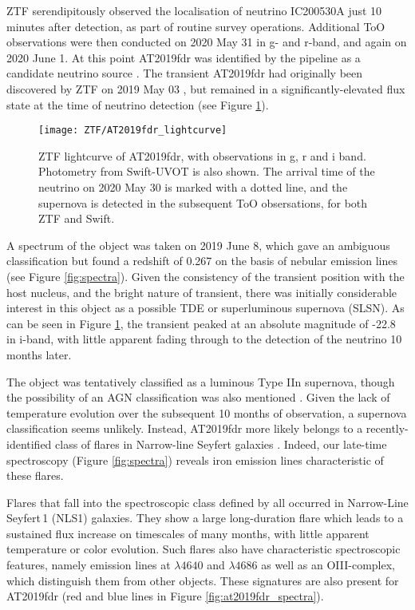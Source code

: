 ZTF serendipitously observed the localisation of neutrino IC200530A just 10 minutes after detection, as part of routine survey operations\cite{IC200530A}. Additional ToO observations were then conducted on 2020 May 31 in g- and r-band, and again on 2020 June 1. At this point AT2019fdr was identified by the pipeline as a candidate neutrino source  . The transient AT2019fdr had originally been discovered by ZTF on 2019 May 03 \cite{at2019fdr_ampel_disc}, but remained in a significantly-elevated flux state at the time of neutrino detection (see Figure \ref{fig:AT2019fdr_lightcurve}). 

\begin{figure}[!ht]
	\centering \texttt{[image: ZTF/AT2019fdr\_lightcurve]}
	\caption{ZTF lightcurve of AT2019fdr, with observations in g, r and i band. Photometry from Swift-UVOT is also shown. The arrival time of the neutrino on 2020 May 30 is marked with a dotted line, and the supernova is detected in the subsequent ToO obsersations, for both ZTF and Swift.}
	\label{fig:AT2019fdr_lightcurve}
\end{figure}

A spectrum of the object was taken on 2019 June 8, which gave an ambiguous classification but found a redshift of 0.267 on the basis of nebular emission lines (see Figure \ref{fig:spectra}). Given the consistency of the transient position with the host nucleus, and the bright nature of transient, there was initially considerable interest in this object as a possible TDE or superluminous supernova (SLSN). As can be seen in Figure \ref{fig:AT2019fdr_lightcurve}, the transient peaked at an absolute magnitude of -22.8 in i-band, with little apparent fading through to the detection of the neutrino 10 months later. 

The object was tentatively classified as a luminous Type IIn supernova, though the possibility of an AGN classification was also mentioned \cite{at2019fdr_tns_class}.
Given the lack of temperature evolution over the subsequent 10 months of observation, a supernova classification seems unlikely. Instead, AT2019fdr more likely belongs to a recently-identified class of flares in Narrow-line Seyfert galaxies . Indeed, our late-time spectroscopy (Figure \ref{fig:spectra}) reveals iron emission lines  characteristic of these flares.

Flares that fall into the spectroscopic class defined by \cite{trakhtenbrot19} all occurred in Narrow-Line Seyfert\,1 (NLS1) galaxies. They show a large long-duration flare which leads to a sustained flux increase on timescales of many months, with little apparent temperature or color evolution. Such flares also have characteristic spectroscopic features, namely emission lines at $\lambda4640$ and $\lambda4686$ as well as an OIII-complex, which distinguish them from other objects. These signatures are also present for AT2019fdr (red and blue lines in Figure \ref{fig:at2019fdr_spectra}).

